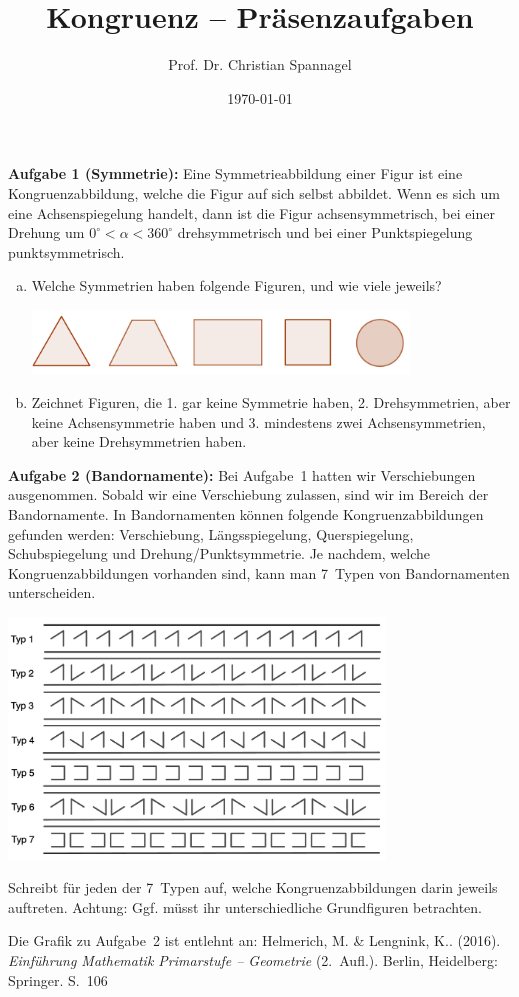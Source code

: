 \documentclass{cssheet}
\title{Kongruenz -- Präsenzaufgaben}
\author{Prof. Dr. Christian Spannagel}
\date{\today}
\begin{document}
\printtitle

\vspace*{5mm}

\textbf{Aufgabe 1 (Symmetrie):}  Eine Symmetrieabbildung einer Figur ist eine Kongruenzabbildung, welche die Figur auf sich selbst abbildet. Wenn es sich um eine Achsenspiegelung handelt, dann ist die Figur achsensymmetrisch, bei einer Drehung um $0^{\circ}<\alpha<360^{\circ}$ drehsymmetrisch und bei einer Punktspiegelung punktsymmetrisch.
\begin{enumerate}[a)]
\item Welche Symmetrien haben folgende Figuren, und wie viele jeweils?
\begin{center}
\includegraphics[width=10cm]{symmetrische-figuren.png}
\end{center} 
\item Zeichnet Figuren, die 1. gar keine Symmetrie haben, 2. Drehsymmetrien, aber keine Achsensymmetrie haben und 3. mindestens zwei Achsensymmetrien, aber keine Drehsymmetrien haben.
\end{enumerate}


\textbf{Aufgabe 2 (Bandornamente):}  Bei Aufgabe~1 hatten wir Verschiebungen ausgenommen. Sobald wir eine Verschiebung zulassen, sind wir im Bereich der Bandornamente. In Bandornamenten können folgende Kongruenzabbildungen gefunden werden: Verschiebung, Längsspiegelung, Querspiegelung, Schubspiegelung und Drehung/Punktsymmetrie. Je nachdem, welche Kongruenzabbildungen vorhanden sind, kann man 7~Typen von Bandornamenten unterscheiden.

\begin{center}
\includegraphics[width=10cm]{bandornamente.png}
\end{center} 

Schreibt für jeden der 7~Typen auf, welche Kongruenzabbildungen darin jeweils auftreten. Achtung: Ggf. müsst ihr unterschiedliche Grundfiguren betrachten.

Die Grafik zu Aufgabe~2 ist entlehnt an: Helmerich, M. \& Lengnink, K.. (2016). \emph{Einführung Mathematik Primarstufe -- Geometrie} (2.~Aufl.). Berlin, Heidelberg: Springer. S.~106

\newpage
\printlicense

\printsocials
\end{document}
